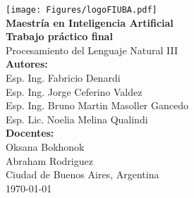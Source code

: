 \begin{titlepage}
    \centering
    \texttt{[image: Figures/logoFIUBA.pdf]}\\[2cm]

    {\Large \textbf{Maestría en Inteligencia Artificial}}\\[1cm]

    {\Huge \textbf{Trabajo práctico final}}\\[0.5cm]
    {\Large Procesamiento del Lenguaje Natural III}\\[2cm]

    \textbf{Autores:}\\[0.3cm]
    Esp. Ing. Fabricio Denardi \\ 
    Esp. Ing. Jorge Ceferino Valdez \\ 
    Esp. Ing. Bruno Martin	Masoller Gancedo \\
    Esp. Lic. Noelia Melina	Qualindi \\[1cm]
    
    \textbf{Docentes:} \\
    Oksana	Bokhonok \\
    Abraham	Rodriguez \\

    \vfill
    {\large Ciudad de Buenos Aires, Argentina \\[0.3cm]
    \today}
\end{titlepage}
